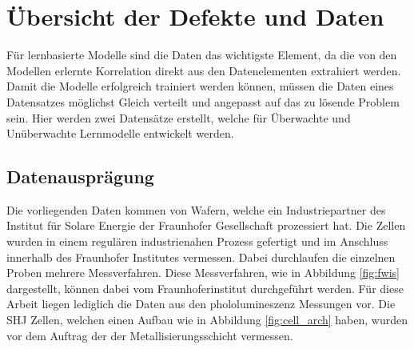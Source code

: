 \iffalse

\definecolor{frhorange}{RGB}{242,148,0}
\definecolor{frhblue}{RGB}{31,130,192}
\definecolor{frhgr}{RGB}{23,156,125}
\definecolor{frholiv}{RGB}{177,200,0}


\fi




\chapter{Übersicht der Defekte und Daten}
\label{chap:übersicht_der_defekte_und_daten}
\iffalse
Für die Auswahl von geeigneten Netzwerken zur Defekterkennung ist es nötig, verschiedene Fragen, im Bezug auf die Daten, genau zu betrachten:
\begin{itemize}
    \item Welche Strukturen sollen in den Daten erkannt werden?
    \item Welche Datenausprägung ist vorhanden? 
    \item Welche Zeitkomplexität darf nicht überschritten werden? 
    \item Welche Güte ist für die Qualität der Vorhersagen relevant?
\end{itemize}

Da diese Fragen alle stark mit den vorhandenen Rohdaten in Verbindung stehen, müssen diese genau analysiert werden. 
\fi

 Für lernbasierte Modelle sind die Daten das wichtigste Element, da die von den Modellen erlernte Korrelation direkt aus den Datenelementen extrahiert werden.\\
 Damit die Modelle erfolgreich trainiert werden können, müssen die Daten eines Datensatzes möglichst Gleich verteilt und angepasst auf das zu lösende Problem sein. Hier werden zwei Datensätze erstellt, welche für Überwachte und Unüberwachte Lernmodelle entwickelt werden.   
 
 \section{Datenausprägung}
  Die vorliegenden Daten kommen von Wafern, welche ein Industriepartner des Institut für Solare Energie der Fraunhofer Gesellschaft prozessiert hat. 
  Die Zellen wurden in einem regulären industrienahen Prozess gefertigt und im Anschluss innerhalb des Fraunhofer Institutes vermessen. Dabei durchlaufen die einzelnen Proben mehrere Messverfahren. Diese Messverfahren, wie in Abbildung \ref{fig:fwis} dargestellt, können dabei vom Fraunhoferinstitut durchgeführt werden. Für diese Arbeit liegen lediglich die Daten aus den phololumineszenz Messungen vor. Die SHJ Zellen, welchen einen Aufbau wie in Abbildung \ref{fig:cell_arch} haben, wurden vor dem Auftrag der der Metallisierungsschicht vermessen.    

